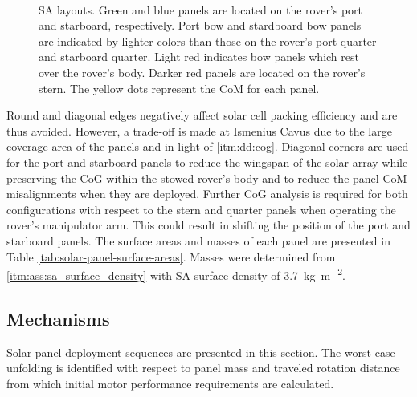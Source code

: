 \begin{figure}[h]
\begin{subfigure}[t]{\subfigureWidth}
		\label{fig:sub:solar-array-layouts-for-ismenius-cavus}
	\end{subfigure}\\[0.8ex]
    \caption[Solar array layouts]
            {\ac{SA} layouts. Green and blue panels are located on the rover's port and starboard, respectively. Port bow and stardboard bow panels are indicated by lighter colors than those on the rover's port quarter and starboard quarter. Light red indicates bow panels which rest over the rover's body. Darker red panels are located on the rover's stern. The yellow dots represent the \ac{CoM} for each panel.}
    \label{fig:solar-array-layouts-for-missions-sites}
\vspace{-2ex}
\end{figure}

\vspace{0.5cm}

Round and diagonal edges negatively affect solar cell packing efficiency and are thus avoided. However, a trade-off is made at Ismenius Cavus due to the large coverage area of the panels and in light of \ref{itm:dd:cog}. Diagonal corners are used for the port and starboard panels to reduce the wingspan of the solar array while preserving the \ac{CoG} within the stowed rover's body and to reduce the panel \ac{CoM} misalignments when they are deployed. Further \ac{CoG} analysis is required for both configurations with respect to the stern and quarter panels when operating the rover's manipulator arm. This could result in shifting the position of the port and starboard panels. The surface areas and masses of each panel are presented in Table \ref{tab:solar-panel-surface-areas}. Masses were determined from \ref{itm:ass:sa_surface_density} with \ac{SA} surface density of \SI{3.7}{kg.m^{-2}}.

\vspace{0.5cm}





\clearpage
\subsection{Mechanisms}
Solar panel deployment sequences are presented in this section. The worst case unfolding is identified with respect to panel mass and traveled rotation distance from which initial motor performance requirements are calculated.

